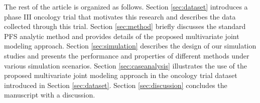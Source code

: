 


The rest of the article is organized as follows. Section \ref{sec:dataset} introduces a phase III oncology trial that motivates this research and describes the data collected through this trial. Section \ref{sec:method} briefly discusses the standard \ac{PFS} analytic method and provides details of the proposed multivariate joint modeling approach. Section \ref{sec:simulation} describes the design of our simulation studies and presents the performance and properties of different methods under various simulation scenarios. Section \ref{sec:caseanalysis} illustrates the use of the proposed multivariate joint modeling approach in the oncology trial dataset introduced in Section \ref{sec:dataset}. Section \ref{sec:discussion} concludes the manuscript with a discussion.

